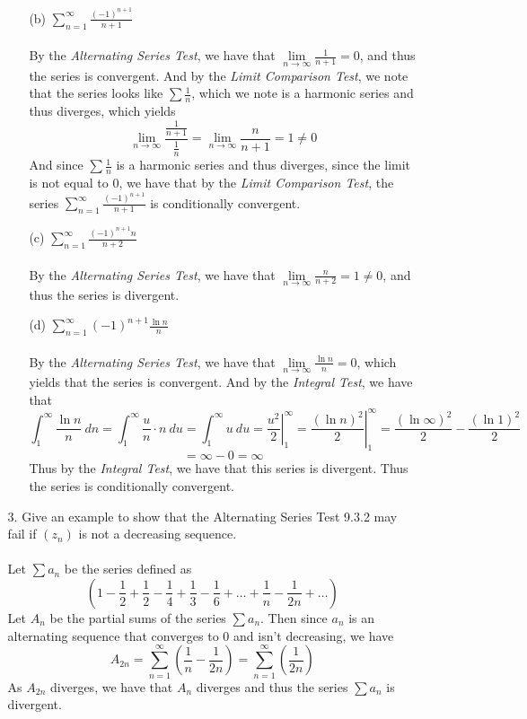 \documentclass[12pt,letterpaper]{article}
\newcommand{\limx}[2]{\displaystyle\lim\limits_{#1 \to #2}}
\theoremstyle{case}
\theoremstyle{definition}
\begin{document}
\begin{enumerate}
\begin{enumerate}
\begin{enumerate}
				\item[(b)] $\displaystyle\sum_{n=1}^{\infty} \frac{(-1)^{n+1}}{n+1}$
				\\\\By the \textit{Alternating Series Test}, we have that $\limx{n}{\infty} \frac{1}{n+1} = 0$, and thus the series is convergent. And by the \textit{Limit Comparison Test}, we note that the series looks like $\sum \frac{1}{n}$, which we note is a harmonic series and thus diverges, which yields
				\[\limx{n}{\infty} \frac{\displaystyle\frac{1}{n+1}}{\frac{1}{n}} = \limx{n}{\infty} \frac{n}{n+1} = 1 \neq 0\]
				And since $\sum \frac{1}{n}$ is a harmonic series and thus diverges, since the limit is not equal to 0, we have that by the \textit{Limit Comparison Test}, the series $\displaystyle\sum_{n=1}^{\infty} \frac{(-1)^{n+1}}{n+1}$ is conditionally convergent.\\
				
				\item[(c)] $\displaystyle\sum_{n=1}^{\infty} \frac{(-1)^{n+1}n}{n+2}$
				\\\\By the \textit{Alternating Series Test}, we have that $\limx{n}{\infty} \frac{n}{n+2} = 1 \neq 0$, and thus the series is divergent.\\
				
				\item[(d)] $\displaystyle\sum_{n=1}^{\infty} (-1)^{n+1} \frac{\ln n}{n}$
				\\\\By the \textit{Alternating Series Test}, we have that $\limx{n}{\infty} \frac{\ln n}{n} = 0$, which yields that the series is convergent. And by the \textit{Integral Test}, we have that
				\[\int_{1}^{\infty} \frac{\ln n}{n}\ dn = \int_{1}^{\infty} \frac{u}{n}\cdot n\ du = \int_{1}^{\infty} u\ du = \left.\frac{u^2}{2}\right|_1^\infty = \left.\frac{(\ln n)^2}{2}\right|_1^\infty = \frac{(\ln \infty)^2}{2} - \frac{(\ln 1)^2}{2}\]
				\[= \infty - 0 = \infty\]
				Thus by the \textit{Integral Test}, we have that this series is divergent. Thus the series is conditionally convergent.\\
				
			\end{enumerate}
		
			\item[3.] Give an example to show that the Alternating Series Test 9.3.2 may fail if $(z_n)$ is not a decreasing sequence.
			\\\\Let $\sum a_n$ be the series defined as
			\[\left(1-\frac{1}{2}+\frac{1}{2}-\frac{1}{4}+\frac{1}{3}-\frac{1}{6}+\dots+\frac{1}{n}-\frac{1}{2n}+\dots\right)\]
			Let $A_n$ be the partial sums of the series $\sum a_n$. Then since $a_n$ is an alternating sequence that converges to 0 and isn't decreasing, we have
			\[A_{2n}=\sum_{n=1}^{\infty} \left(\frac{1}{n}-\frac{1}{2n}\right) = \sum_{n=1}^{\infty} \left(\frac{1}{2n}\right)\]
			As $A_{2n}$ diverges, we have that $A_n$ diverges and thus the series $\sum a_n$ is divergent.\\
			

\end{enumerate}
\end{enumerate}
\end{document}
